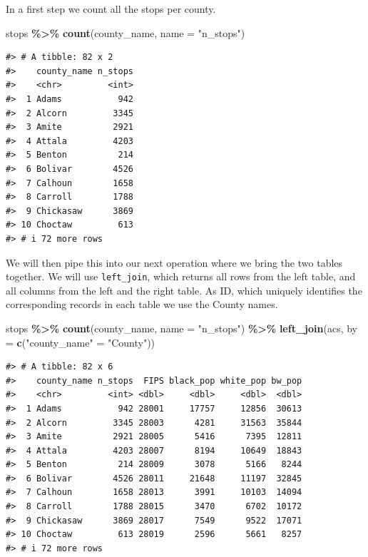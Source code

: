 \documentclass[
]{book}
\newenvironment{Shaded}{\begin{snugshade}}{\end{snugshade}}
\newcommand{\AttributeTok}[1]{\textcolor[rgb]{0.13,0.29,0.53}{#1}}
\newcommand{\FunctionTok}[1]{\textcolor[rgb]{0.13,0.29,0.53}{\textbf{#1}}}
\newcommand{\NormalTok}[1]{#1}
\newcommand{\OtherTok}[1]{\textcolor[rgb]{0.56,0.35,0.01}{#1}}
\newcommand{\SpecialCharTok}[1]{\textcolor[rgb]{0.81,0.36,0.00}{\textbf{#1}}}
\newcommand{\StringTok}[1]{\textcolor[rgb]{0.31,0.60,0.02}{#1}}
\begin{document}
In a first step we count all the stops per county.

\begin{Shaded}
\begin{Highlighting}[]
\NormalTok{stops }\SpecialCharTok{\%\textgreater{}\%} 
  \FunctionTok{count}\NormalTok{(county\_name, }\AttributeTok{name =} \StringTok{"n\_stops"}\NormalTok{) }
\end{Highlighting}
\end{Shaded}

\begin{verbatim}
#> # A tibble: 82 x 2
#>    county_name n_stops
#>    <chr>         <int>
#>  1 Adams           942
#>  2 Alcorn         3345
#>  3 Amite          2921
#>  4 Attala         4203
#>  5 Benton          214
#>  6 Bolivar        4526
#>  7 Calhoun        1658
#>  8 Carroll        1788
#>  9 Chickasaw      3869
#> 10 Choctaw         613
#> # i 72 more rows
\end{verbatim}

We will then pipe this into our next operation where we bring the two tables together. We will use \texttt{left\_join}, which returns all rows from the left table, and all columns from the left and the right table. As ID, which uniquely identifies the corresponding records in each table we use the County names.

\begin{Shaded}
\begin{Highlighting}[]
\NormalTok{stops }\SpecialCharTok{\%\textgreater{}\%} 
  \FunctionTok{count}\NormalTok{(county\_name, }\AttributeTok{name =} \StringTok{"n\_stops"}\NormalTok{) }\SpecialCharTok{\%\textgreater{}\%} 
  \FunctionTok{left\_join}\NormalTok{(acs, }\AttributeTok{by =} \FunctionTok{c}\NormalTok{(}\StringTok{"county\_name"} \OtherTok{=} \StringTok{"County"}\NormalTok{)) }
\end{Highlighting}
\end{Shaded}

\begin{verbatim}
#> # A tibble: 82 x 6
#>    county_name n_stops  FIPS black_pop white_pop bw_pop
#>    <chr>         <int> <dbl>     <dbl>     <dbl>  <dbl>
#>  1 Adams           942 28001     17757     12856  30613
#>  2 Alcorn         3345 28003      4281     31563  35844
#>  3 Amite          2921 28005      5416      7395  12811
#>  4 Attala         4203 28007      8194     10649  18843
#>  5 Benton          214 28009      3078      5166   8244
#>  6 Bolivar        4526 28011     21648     11197  32845
#>  7 Calhoun        1658 28013      3991     10103  14094
#>  8 Carroll        1788 28015      3470      6702  10172
#>  9 Chickasaw      3869 28017      7549      9522  17071
#> 10 Choctaw         613 28019      2596      5661   8257
#> # i 72 more rows
\end{verbatim}
\end{document}
